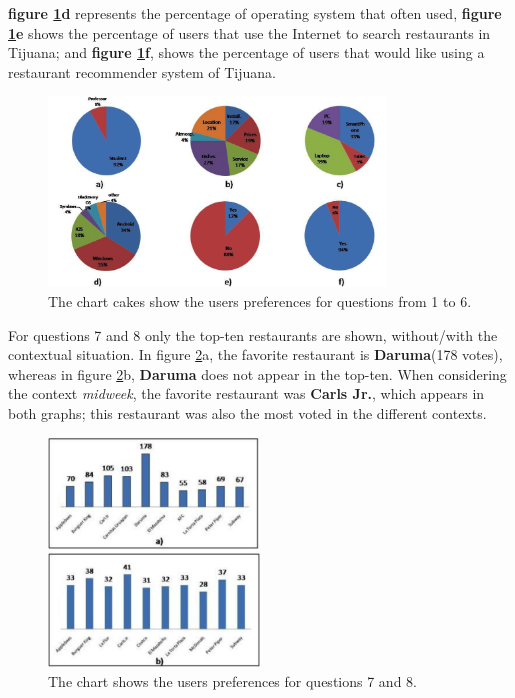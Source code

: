 \textbf{figure \ref{fig:cakeschart}d} represents the percentage of
operating system that often used, \textbf{figure
\ref{fig:cakeschart}e} shows the percentage of users that use the
Internet to search restaurants in Tijuana; and \textbf{figure
\ref{fig:cakeschart}f}, shows the percentage of users that would like
using a restaurant recommender system of Tijuana.
\begin{figure}
\captionsetup{justification=centering,margin=2cm,font=footnotesize}
\centering
\setlength\fboxsep{0pt}
\includegraphics[width=0.8\textwidth]{img/cakes.png}
\caption{The chart cakes show the users preferences for questions from 1 to 6.}
\label{fig:cakeschart}     
\end{figure}
For questions 7 and 8 only the top-ten restaurants are shown,
without/with the contextual situation. In figure \ref{fig:barschart}a,
the favorite restaurant is \textbf{Daruma}(178 votes),  whereas in
figure \ref{fig:barschart}b, \textbf{Daruma} does not appear in the
top-ten. When considering the context \textit{midweek}, the favorite
restaurant was \textbf{Carls Jr.}, which appears in both graphs; this
restaurant was also the most voted in the different contexts.
\begin{figure}
\captionsetup{justification=centering,margin=2cm,font=footnotesize}
\centering
\setlength\fboxsep{0pt}
\includegraphics[width=0.5\textwidth]{img/bars.png}
\caption{The chart shows the users preferences for questions 7 and 8.}
\label{fig:barschart}     
\end{figure}
